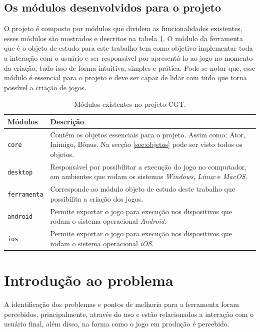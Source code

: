 \documentclass[12pt,twoside,openright,a4paper,english,brazil,sumario=tradicional]{abntex2}
\begin{document}
\subsection{Os módulos desenvolvidos para o projeto}
O projeto é composto por módulos que dividem as funcionalidades existentes, esses módulos são mostrados e descritos na tabela \ref{table:modulos}. O módulo da ferramenta que é o objeto de estudo para este trabalho tem como objetivo implementar toda a interação com o usuário e ser responsável por apresentá-lo ao jogo no momento da criação, tudo isso de forma intuitiva, simples e prática. Pode-se notar que, esse módulo é essencial para o projeto e deve ser capaz de lidar com tudo que torna possível a criação de jogos.
\begin{table}[h]
   \centering
   \begin{tabular}{ | l | p{10cm} | }
      \hline
      \textbf{Módulos} & \textbf{Descrição} \\
      \hline
      \texttt{core} & Contém os objetos essenciais para o projeto. Assim como: Ator, Inimigo, Bônus. Na secção \ref{sec:objetos} pode ser visto todos os objetos. \\
      \hline
      \texttt{desktop} & Responsável por possibilitar a execução do jogo no computador, em ambientes que rodam os sistemas \emph{Windows}, \emph{Linux} e \emph{MacOS}. \\
      \hline
      \texttt{ferramenta} & Corresponde ao módulo objeto de estudo deste trabalho que possibilita a criação dos jogos. \\
      \hline
      \texttt{android} & Permite exportar o jogo para execução nos dispositivos que rodam o sistema operacional \emph{Android}. \\
      \hline
      \texttt{ios} & Permite exportar o jogo para execução nos dispositivos que rodam o sistema operacional \emph{iOS}. \\
      \hline
   \end{tabular}
   \caption{Módulos existentes no projeto CGT.}
   \label{table:modulos}
\end{table}
\section{Introdução ao problema}
\label{sec:intro-problema}
A identificação dos problemas e pontos de melhoria para a ferramenta foram percebidos, principalmente, através do uso e estão relacionados a interação com o usuário final, além disso, na forma como o jogo em produção é percebido.
\end{document}
